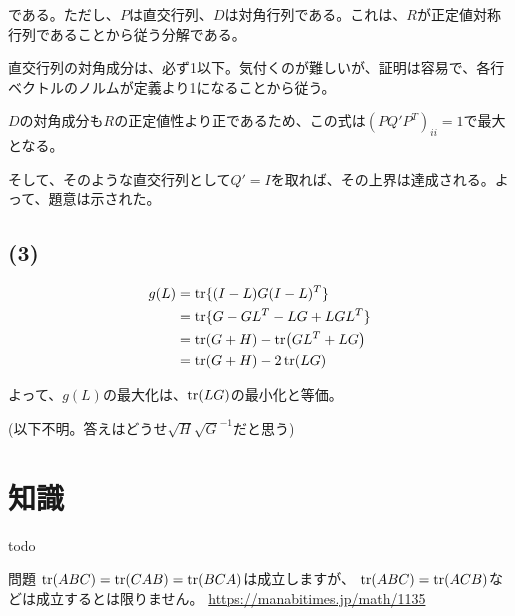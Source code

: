 \documentclass[a4paper, 10pt, dvipdfmx]{jlreq}
\begin{document}
である。ただし、$P$は直交行列、$D$は対角行列である。これは、$R$が正定値対称行列であることから従う分解である。

直交行列の対角成分は、必ず1以下。気付くのが難しいが、証明は容易で、各行ベクトルのノルムが定義より1になることから従う。

$D$の対角成分も$R$の正定値性より正であるため、この式は$(PQ'P^T)_{ii}=1$で最大となる。

そして、そのような直交行列として$Q'=I$を取れば、その上界は達成される。よって、題意は示された。

\subsection*{(3)}

\begin{align*}
  g(L) & =\tr\{(I-L)G(I-L)^T\}   \\
       & =\tr\{G-GL^T-LG+LGL^T\} \\
       & =\tr(G+H)-\tr(GL^T+LG)  \\
       & =\tr(G+H)-2\tr(LG)      \\
\end{align*}

よって、$g(L)$の最大化は、$\tr(LG)$の最小化と等価。

(以下不明。答えはどうせ$\sqrt{H}\sqrt{G}^{-1}$だと思う)

\section{知識}

todo

\begin{itembox}[l]{問題}
  $\tr(ABC)=\tr(CAB)=\tr(BCA)$は成立しますが、
  $\tr(ABC)=\tr(ACB)$などは成立するとは限りません。
  \url{https://manabitimes.jp/math/1135}
\end{itembox}

\begin{thebibliography}{9}

\end{thebibliography}
\end{document}
